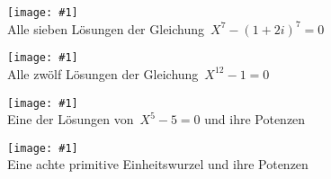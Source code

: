 \documentclass[a4paper,ngerman,landscape]{scrartcl}
\newcommand{\slide}[3]{\begin{center}
  \texttt{[image: \#1]}\\[1.5em]

  #2
\end{center}\newpage}
\begin{document}
\slide{Kreisteilungspolynom7-crop}{Alle sieben Lösungen der Gleichung~$X^7 - (1+2i)^7 = 0$}{3.5}

\slide{Kreisteilungspolynom12-crop}{Alle zwölf Lösungen der Gleichung~$X^{12} - 1 = 0$}{0.7}

\slide{Weg5-crop}{Eine der Lösungen von~$X^5 - 5 = 0$ und ihre Potenzen}{2.3}

\slide{WegPrimitiveEW-crop}{Eine achte primitive Einheitswurzel und ihre Potenzen}{0.6}
\end{document}
